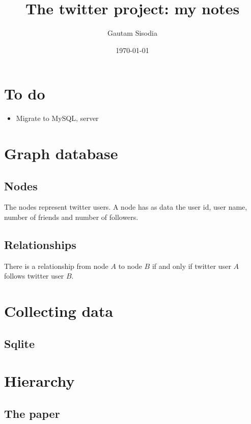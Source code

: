 \documentclass[11pt]{amsart}
\begin{document}
\title[]{The twitter project: my notes}
\date{\today}
\author{Gautam Sisodia} 
\maketitle

\section{To do}

\begin{itemize}
\item Migrate to MySQL, server
\end{itemize}


\section{Graph database}

\subsection{Nodes}

The nodes represent twitter users. A node has as data the user id, user name, number of friends and number of followers.

\subsection{Relationships}

There is a relationship from node $A$ to node $B$ if and only if twitter user $A$ follows twitter user $B$. 


\section{Collecting data}

\subsection{Sqlite}


\section{Hierarchy}


\subsection{The paper \cite{hier1}}
\end{document}
